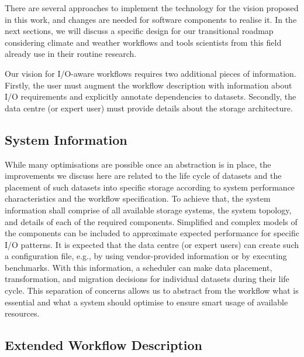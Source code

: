 \documentclass{superfri}
\begin{document}
There are several approaches to implement the technology for the vision proposed in this work, and changes are needed for software components to realise it.
In the next sections, we will discuss a specific design for our transitional roadmap considering climate and weather workflows and tools scientists from this field already use in their routine research.

Our vision for I/O-aware workflows requires two additional pieces of information.
Firstly, the user must augment the workflow description with information about I/O requirements and explicitly annotate dependencies to datasets.
Secondly, the data centre (or expert user) must provide details about the storage architecture.

\subsection{System Information}

While many optimisations are possible once an abstraction is in place, the improvements we discuss here are related to the life cycle of datasets and the placement of such datasets into specific storage according to system performance characteristics and the workflow specification.
To achieve that, the system information shall comprise of all available storage systems, the system topology, and details of each of the required components.
Simplified and complex models of the components can be included to approximate expected performance for specific I/O patterns.
It is expected that the data centre (or expert users) can create such a configuration file, e.g., by using vendor-provided information or by executing benchmarks.
With this information, a scheduler can make data placement, transformation, and migration decisions for individual datasets during their life cycle.
This separation of concerns allows us to abstract from the workflow what is essential and what a system should optimise to ensure smart usage of available resources.

\subsection{Extended Workflow Description}
\end{document}
